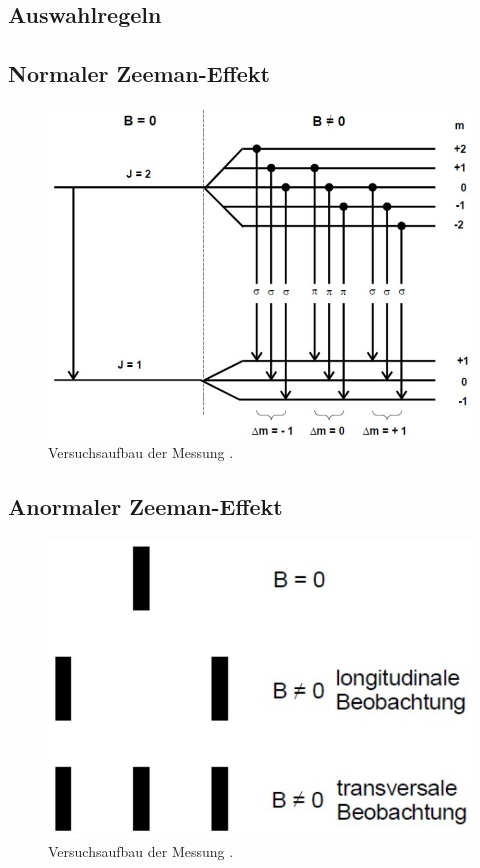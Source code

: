 \subsection{Auswahlregeln}

\subsection{Normaler Zeeman-Effekt}

\vspace{-5pt}
\begin{figure}[H]
    \centering
    \includegraphics[scale=0.3]{content/normalerzeeman.png}
    \caption{Versuchsaufbau der Messung \cite{alt}.}
    \label{fig:norm}
\end{figure}

\subsection{Anormaler Zeeman-Effekt}

\vspace{-5pt}
\begin{figure}[H]
    \centering
    \includegraphics[scale=0.3]{content/polarisation.png}
    \vspace{-10pt}
    \vspace{3pt}
    \caption{Versuchsaufbau der Messung \cite{alt}.}
    \label{fig:pol}
\end{figure}


